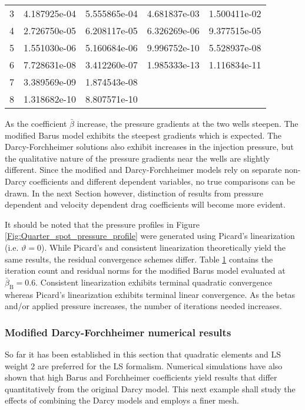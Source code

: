 \documentclass[11pt,reqno]{amsart}
\begin{document}
\begin{table}[t!]
\begin{tabular}{lcc|cc}
      3 & 4.187925e-04 & 5.555865e-04 & 4.681837e-03 & 1.500411e-02 \\
      4 & 2.726750e-05 & 6.208117e-05 & 6.326269e-06 & 9.377515e-05 \\
      5 & 1.551030e-06 & 5.160684e-06 & 9.996752e-10 & 5.528937e-08 \\
      6 & 7.728631e-08 & 3.412260e-07 & 1.985333e-13 & 1.116834e-11 \\
      7 & 3.389569e-09 & 1.874543e-08 & & \\
      8 & 1.318682e-10 & 8.807571e-10 & & \\
  \end{tabular}
  \label{Tab:five_spot_MB_iterations}
\end{table}
As the coefficient $\bar{\beta}$ increase, the pressure gradients at the two wells 
steepen. The modified Barus model exhibits the steepest gradients which is expected.
The Darcy-Forchheimer solutions also exhibit increases in the injection pressure, but the 
qualitative nature of the pressure gradients near the wells are slightly different. Since
the modified and Darcy-Forchheimer models rely on separate non-Darcy coefficients and 
different dependent variables, no true comparisons can be drawn. In the next 
Section however, distinction of results from pressure dependent and velocity dependent 
drag coefficients will become more evident.

It should be noted that the pressure profiles in Figure 
\ref{Fig:Quarter_spot_pressure_profile} were generated using Picard's 
linearization (i.e. $\vartheta = 0$). While Picard's 
and consistent linearization theoretically yield the same results, the 
residual convergence schemes differ. Table \ref{Tab:five_spot_MB_iterations} 
contains the iteration count and residual norms for the modified Barus model 
evaluated at $\bar{\beta}_{\mathrm{B}} = 0.6$. Consistent linearization exhibits 
terminal quadratic convergence whereas Picard's linearization exhibits terminal
linear convergence. As the betas and/or applied pressure increases, the number
of iterations needed increases.

\subsubsection{Modified Darcy-Forchheimer numerical results}
So far it has been established in this section that quadratic elements and LS weight 2 
are preferred for the LS formalism. Numerical simulations have also 
shown that high Barus and Forchheimer coefficients yield results that differ 
quantitatively from the original Darcy model. This next example shall study
the effects of combining the Darcy models and employs a finer mesh.
\end{document}
